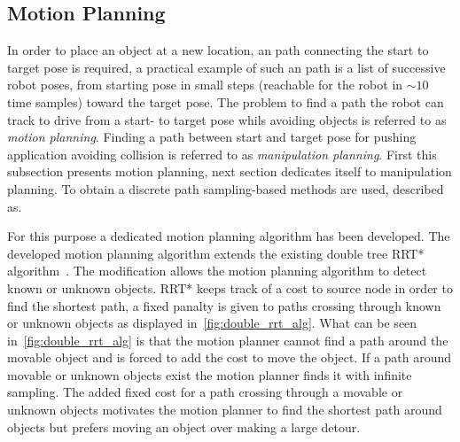 \subsection{Motion Planning}%
\label{subsec:motion_planning}

In order to place an object at a new location, an path connecting the start to target pose is required, a practical example of such an path is a list of successive robot poses, from starting pose in small steps (reachable for the robot in $\sim10$ time samples) toward the target pose. The problem to find a path the robot can track to drive from a start- to target pose whils avoiding objects is referred to as \textit{motion planning}. Finding a path between start and target pose for pushing application avoiding collision is referred to as \textit{manipulation planning}. First this subsection presents motion planning, next section dedicates itself to manipulation planning. To obtain a discrete path sampling-based methods are used, described as.\bs

\textit{}\bs

For this purpose a dedicated motion planning algorithm has been developed. The developed motion planning algorithm extends the existing double tree \ac{RRT*} algorithm~\cite{chen_fast_2018}. The modification allows the motion planning algorithm to detect known or unknown objects. \ac{RRT*} keeps track of a cost to source node in order to find the shortest path, a fixed panalty is given to paths crossing through known or unknown objects as displayed in~\cref{fig:double_rrt_alg}. What can be seen in~\cref{fig:double_rrt_alg} is that the motion planner cannot find a path around the movable object and is forced to add the cost to move the object. If a path around movable or unknown objects exist the motion planner finds it with infinite sampling. The added fixed cost for a path crossing through a movable or unknown objects motivates the motion planner to find the shortest path around objects but prefers moving an object over making a large detour.

